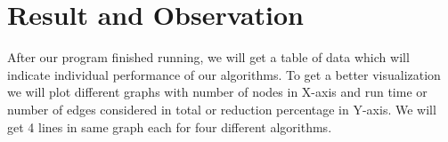 \documentclass[conference]{IEEEtran}
\begin{document}
\section{Result and Observation}
After our program finished running, we will get a table of data which will indicate individual performance of our algorithms. To get a better visualization we will plot different graphs with number of nodes in X-axis and run time or number of edges considered in total or reduction percentage in Y-axis. We will get 4 lines in same graph each for four different algorithms.
\end{document}
